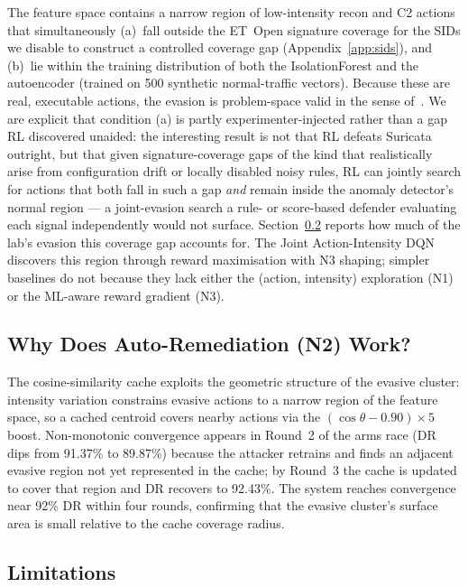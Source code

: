 \documentclass[sigconf]{acmart}
\begin{document}
The feature space contains a narrow region of low-intensity recon
and C2 actions that simultaneously (a)~fall outside the ET~Open
signature coverage for the SIDs we disable to construct a controlled
coverage gap (Appendix~\ref{app:sids}), and
(b)~lie within the training distribution of both the IsolationForest
and the autoencoder (trained on 500 synthetic normal-traffic vectors).
Because these are real, executable actions, the evasion is
problem-space valid in the sense of~\cite{pierazzi2020intriguing}. We
are explicit that condition (a) is partly experimenter-injected rather
than a gap RL discovered unaided: the interesting result is not that RL
defeats Suricata outright, but that given signature-coverage gaps of the
kind that realistically arise from configuration drift or locally
disabled noisy rules, RL can jointly search for actions that both fall
in such a gap \emph{and} remain inside the anomaly detector's normal
region --- a joint-evasion search a rule- or score-based defender
evaluating each signal independently would not surface. Section~\ref{sec:disc:limits}
reports how much of the lab's evasion this coverage gap accounts for.
The Joint Action-Intensity DQN discovers this region through reward
maximisation with N3 shaping; simpler baselines do not because they
lack either the (action, intensity) exploration (N1) or the ML-aware
reward gradient (N3).

\subsection{Why Does Auto-Remediation (N2) Work?}
\label{sec:disc:n2}

The cosine-similarity cache exploits the geometric structure of the
evasive cluster: intensity variation constrains evasive actions to a
narrow region of the feature space, so a cached centroid covers nearby
actions via the $(\cos\theta - 0.90) \times 5$ boost. Non-monotonic
convergence appears in Round~2 of the arms race (DR dips from 91.37\% to
89.87\%) because the attacker retrains and finds an adjacent evasive
region not yet represented in the cache; by Round~3 the cache is updated
to cover that region and DR recovers to 92.43\%. The system reaches
convergence near 92\% DR within four rounds, confirming that the evasive
cluster's surface area is small relative to the cache coverage radius.

\subsection{Limitations}
\label{sec:disc:limits}
\end{document}
